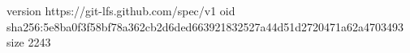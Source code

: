 version https://git-lfs.github.com/spec/v1
oid sha256:5e8ba0f3f58bf78a362cb2d6ded663921832527a44d51d2720471a62a4703493
size 2243
